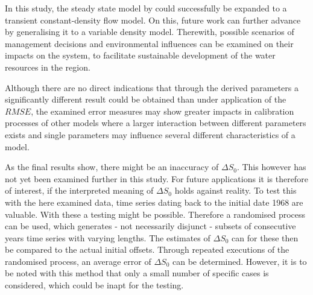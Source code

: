 In this study, the steady state model by \textcite{Horn.2021} could successfully be expanded to a transient constant-density flow model. 
On this, future work can further advance by generalising it to a variable density model. 
Therewith, possible scenarios of management decisions and environmental influences can be examined on their impacts on the system, to facilitate sustainable development of the water resources in the region.

Although there are no direct indications that through the derived parameters a significantly different result could be obtained than under application of the $RMSE$, the examined error measures may show greater impacts in calibration processes of other models where a larger interaction between different parameters exists and single parameters may influence several different characteristics of a model.

As the final results show, there might be an inaccuracy of $\Delta S_0$. 
This however has not yet been examined further in this study. 
For future applications it is therefore of interest, if the interpreted meaning of $\Delta S_0$ holds against reality. 
To test this with the here examined data, time series dating back to the initial date 1968 are valuable. 
With these a testing might be possible. 
Therefore a randomised process can be used, which generates - not necessarily disjunct - subsets of consecutive years time series with varying lengths. 
The estimates of $\Delta S_0$ can for these then be compared to the actual initial offsets. 
Through repeated executions of the randomised process, an average error of $\Delta S_0$ can be determined. 
However, it is to be noted with this method that only a small number of specific cases is considered, which could be inapt for the testing.
